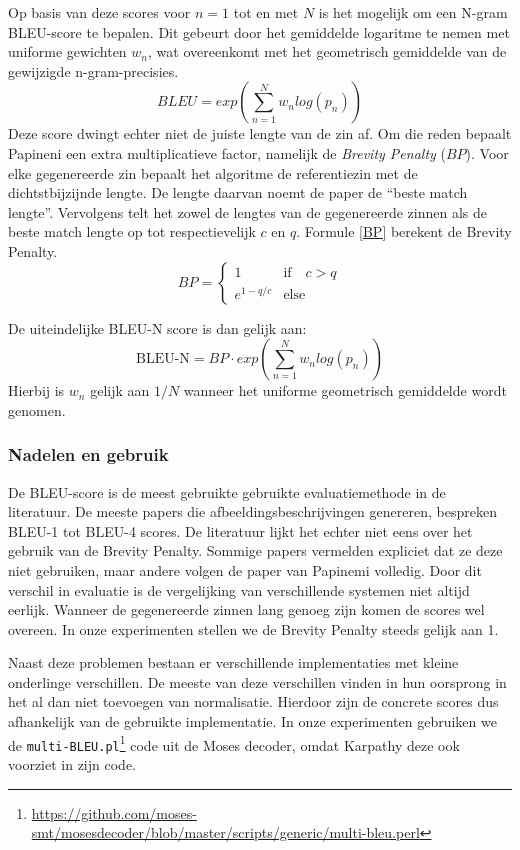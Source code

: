 Op basis van deze scores voor $n=1$ tot en met $N$ is het mogelijk om een N-gram BLEU-score te bepalen. Dit gebeurt door het gemiddelde logaritme te nemen met uniforme gewichten $w_n$, wat overeenkomt met het geometrisch gemiddelde van de gewijzigde n-gram-precisies.
\begin{equation}
BLEU = exp(\sum\limits_{n=1}^N w_nlog(p_n))
\end{equation}
Deze score dwingt echter niet de juiste lengte van de zin af. Om die reden bepaalt Papineni een extra multiplicatieve factor, namelijk de \emph{Brevity Penalty} ($BP$). Voor elke gegenereerde zin bepaalt het algoritme de referentiezin met de dichtstbijzijnde lengte. De lengte daarvan noemt de paper de ``beste match lengte''. Vervolgens telt het zowel de lengtes van de gegenereerde zinnen als de beste match lengte op tot respectievelijk $c$ en $q$. Formule \eqref{BP} berekent de Brevity Penalty.
\begin{equation}BP=
 \begin{cases}
1 & \textrm{if}\quad c > q \\
e^{1-q/c} & \textrm{else}
\end{cases}
\label{BP}
\end{equation}

De uiteindelijke BLEU-N score is dan gelijk aan:
\begin{equation}
\text{BLEU-N} = BP\cdot exp(\sum\limits_{n=1}^N w_nlog(p_n))
\end{equation}
Hierbij is $w_n$ gelijk aan $1/N$ wanneer het uniforme geometrisch gemiddelde wordt genomen.

\subsubsection{Nadelen en gebruik}
De BLEU-score is de meest gebruikte gebruikte evaluatiemethode in de literatuur. De meeste papers die afbeeldingsbeschrijvingen genereren, bespreken BLEU-1 tot BLEU-4 scores. De literatuur lijkt het echter niet eens over het gebruik van de Brevity Penalty. Sommige papers vermelden expliciet dat ze deze niet gebruiken, maar andere volgen de paper van Papinemi volledig. Door dit verschil in evaluatie is de vergelijking van verschillende systemen niet altijd eerlijk. Wanneer de gegenereerde zinnen lang genoeg zijn komen de scores wel overeen.
In onze experimenten stellen we de Brevity Penalty steeds gelijk aan 1.

Naast deze problemen bestaan er verschillende implementaties met kleine onderlinge verschillen. De meeste van deze verschillen vinden in hun oorsprong in het al dan niet toevoegen van normalisatie. Hierdoor zijn de concrete scores dus afhankelijk van de gebruikte implementatie. In onze experimenten gebruiken we de \texttt{multi-BLEU.pl}\footnote{\url{https://github.com/moses-smt/mosesdecoder/blob/master/scripts/generic/multi-bleu.perl}} code uit de Moses decoder\cite{Koehn2006}, omdat Karpathy deze ook voorziet in zijn code.

